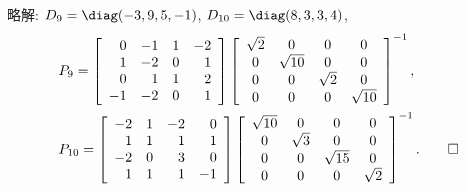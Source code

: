 \documentclass[12pt,twoside]{jarticle}
\newcommand\commentout[1]{#1}
\newcommand\commentout[1]{}
\begin{document}
\commentout{
\noindent
略解: $D_9=\diag(-3,9,5,-1)$, $D_{10}=\diag(8,3,3,4)$, 
\begin{align*}
  &
  P_9 = 
  \left[ 
    \begin{array}{rrrr}
      0 & -1 & 1 & -2 \\
      1 & -2 & 0 & 1 \\
      0 & 1 & 1 & 2 \\
      -1 & -2 & 0 & 1
    \end{array}
  \right]
  \left[ 
    \begin{array}{cccc}
      \sqrt {2} & 0 & 0 & 0 \\
      0 & \sqrt {10} & 0 & 0 \\
      0 & 0 & \sqrt {2} & 0 \\
      0 & 0 & 0 & \sqrt {10}
    \end{array}
  \right]^{-1},
  \\ &
  P_{10} =
  \left[ 
    \begin{array}{rrrr}
      -2 & 1 & -2 & 0 \\
      1 & 1 & 1 & 1 \\
      -2 & 0 & 3 & 0 \\
      1 & 1 & 1 & -1
    \end{array}
  \right]
  \left[ 
    \begin{array}{cccc}
      \sqrt {10} & 0 & 0 & 0 \\
      0 & \sqrt {3} & 0 & 0 \\
      0 & 0 & \sqrt {15} & 0 \\
      0 & 0 & 0 & \sqrt {2}
    \end{array}
  \right]^{-1}.
  \qed
\end{align*}
}

\end{document}
